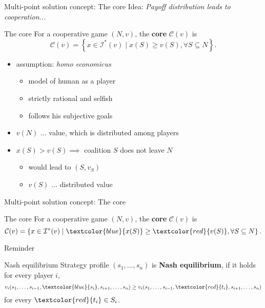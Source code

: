 \documentclass{beamer}
\newcommand{\I}{\mathcal{I}}
\begin{document}
\begin{frame}{Multi-point solution concept: The core}
    Idea: \textit{Payoff distribution leads to cooperation...}
    \begin{block}{The core}
    For a cooperative game $(N,v)$, the \textbf{core} $\mathcal{C}(v)$ is
    \[\mathcal{C}(v) = \left\{x \in \I^*(v) \mid x(S) \geq v(S), \forall S \subseteq N \right\}.\]
    \end{block}
    \begin{itemize}
        \item assumption: \textit{homo economicus} 
        \begin{itemize}
            \item model of human as a player
            \item strictly rational and selfish
            \item follows his subjective goals
        \end{itemize}
        \item $v(N)$ ... value, which is distributed among players
            \item $x(S) > v(S) \implies$ coalition $S$ does not leave $N$ 
            \begin{itemize}
                \item would lead to $(S,v_S)$
                \item $v(S)$ ... distributed value
            \end{itemize}
    \end{itemize}
\end{frame}



\begin{frame}{Multi-point solution concept: The core}
    \begin{block}{The core}
    For a cooperative game $(N,v)$, the \textbf{core} $\mathcal{C}(v)$ is
    \[\mathcal{C}(v) = \left\{x \in \I^*(v) \mid \textcolor{blue}{x(S)} \geq \textcolor{red}{v(S)}, \forall S \subseteq N \right\}.\]
    \end{block}
    Reminder
    \begin{block}{Nash equilibrium}
		Strategy profile $(s_1,\dots,s_n)$ is \textbf{Nash equilibrium}, if it holds for every player $i$,
		\[
			v_i(s_1,\dots,s_{i-1},\textcolor{blue}{s_i},s_{i+1},\dots,s_n) \geq v_i(s_1,\dots,s_{i-1},\textcolor{red}{t_i},s_{i+1},\dots,s_n)
		\]
		for every $\textcolor{red}{t_i} \in S_i$.
	\end{block}
\end{frame}
\end{document}
